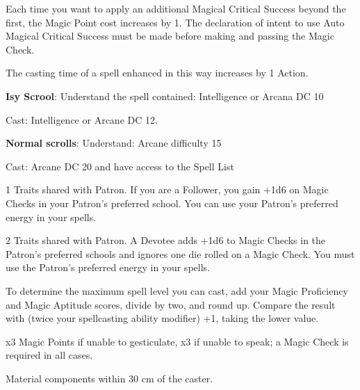 \documentclass[landscape,10pt,a4paper]{article}
\begin{document}
\begin{multicols}{2}
\begin{dmbox}[title=Auto Magical Critical Success - page \pageref{magienova}]
Each time you want to apply an additional Magical Critical Success beyond the first, the Magic Point cost increases by 1. The declaration of intent to use Auto Magical Critical Success must be made before making and passing the Magic Check.

The casting time of a spell enhanced in this way increases by 1 Action.
\end{dmbox}


\begin{dmbox}[title=Reading a Scroll - page \pageref{readscroll}]

\textbf{Isy Scrool}: Understand the spell contained: Intelligence or Arcana DC 10

Cast: Intelligence or Arcane DC 12.

\textbf{Normal scrolls}: Understand: Arcane difficulty 15

Cast: Arcane DC 20 and have access to the Spell List
\end{dmbox}


\begin{dmbox}[title=Follower - page \pageref{magieregoledibase}]
1 Traits shared with Patron. If you are a Follower, you gain +1d6 on Magic Checks in your Patron's preferred school. You can use your Patron's preferred energy in your spells.
\end{dmbox}

\begin{dmbox}[title=Devotee - page \pageref{magieregoledibase}]
2 Traits shared with Patron. A Devotee adds +1d6 to Magic Checks in the Patron's preferred schools and ignores one die rolled on a Magic Check. You must use the Patron's preferred energy in your spells.
\end{dmbox}


\begin{dmbox}[title=Maximum Castable Spell Level - page \pageref{schoolslevels}]
To determine the maximum spell level you can cast, add your Magic Proficiency and Magic Aptitude scores, divide by two, and round up. Compare the result with (twice your spellcasting ability modifier) +1, taking the lower value.
\end{dmbox}

\begin{dmbox}[title=Attempting spells with impediments - page \pageref{magieconimpedimenti}]

x3 Magic Points if unable to gesticulate, x3 if unable to speak; a Magic Check is required in all cases.

Material components within 30 cm of the caster.
\end{dmbox}


\end{multicols}
\end{document}

